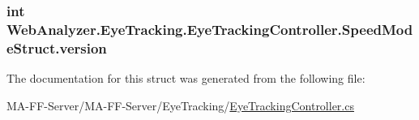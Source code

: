 \subsubsection[{version}]{\setlength{\rightskip}{0pt plus 5cm}int Web\+Analyzer.\+Eye\+Tracking.\+Eye\+Tracking\+Controller.\+Speed\+Mode\+Struct.\+version}\label{struct_web_analyzer_1_1_eye_tracking_1_1_eye_tracking_controller_1_1_speed_mode_struct_a736577a64d2a391051394b4842043ffa}


The documentation for this struct was generated from the following file\+:\begin{DoxyCompactItemize}
\item 
M\+A-\/\+F\+F-\/\+Server/\+M\+A-\/\+F\+F-\/\+Server/\+Eye\+Tracking/\hyperlink{_eye_tracking_controller_8cs}{Eye\+Tracking\+Controller.\+cs}\end{DoxyCompactItemize}
